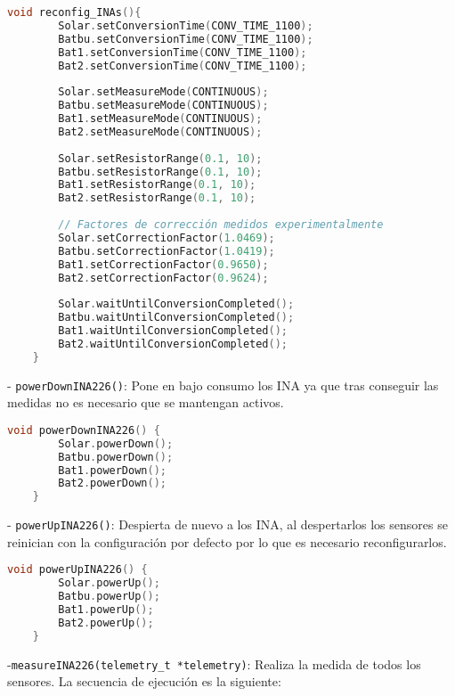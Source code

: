 \begin{lstlisting}[captionpos=b, caption={Codigo funcion reconfig\_INAs}, language=c++]
    void reconfig_INAs(){
        Solar.setConversionTime(CONV_TIME_1100);
        Batbu.setConversionTime(CONV_TIME_1100);
        Bat1.setConversionTime(CONV_TIME_1100);
        Bat2.setConversionTime(CONV_TIME_1100);
    
        Solar.setMeasureMode(CONTINUOUS);
        Batbu.setMeasureMode(CONTINUOUS);
        Bat1.setMeasureMode(CONTINUOUS);
        Bat2.setMeasureMode(CONTINUOUS);
        
        Solar.setResistorRange(0.1, 10);
        Batbu.setResistorRange(0.1, 10);
        Bat1.setResistorRange(0.1, 10);
        Bat2.setResistorRange(0.1, 10);
        
        // Factores de corrección medidos experimentalmente
        Solar.setCorrectionFactor(1.0469);
        Batbu.setCorrectionFactor(1.0419);
        Bat1.setCorrectionFactor(0.9650);
        Bat2.setCorrectionFactor(0.9624);
        
        Solar.waitUntilConversionCompleted();
        Batbu.waitUntilConversionCompleted();
        Bat1.waitUntilConversionCompleted();
        Bat2.waitUntilConversionCompleted();
    }
\end{lstlisting}

- \texttt{powerDownINA226()}: Pone en bajo consumo los INA ya que tras conseguir las medidas no es necesario que se mantengan activos.

\begin{lstlisting}[captionpos=b, caption={Codigo funcion powerDownINA226}, language=c++]
    void powerDownINA226() {
        Solar.powerDown();
        Batbu.powerDown();
        Bat1.powerDown();
        Bat2.powerDown();
    }
\end{lstlisting}


- \texttt{powerUpINA226()}: Despierta de nuevo a los INA, al despertarlos los sensores se reinician con la configuración por defecto por lo que es necesario reconfigurarlos.

\begin{lstlisting}[captionpos=b, caption={Codigo funcion powerUpINA226}, language=c++]
    void powerUpINA226() {
        Solar.powerUp();
        Batbu.powerUp();
        Bat1.powerUp();
        Bat2.powerUp();
    }
\end{lstlisting}

-\texttt{measureINA226(telemetry\_t *telemetry)}: Realiza la medida de todos los sensores. La secuencia de ejecución es la siguiente:


